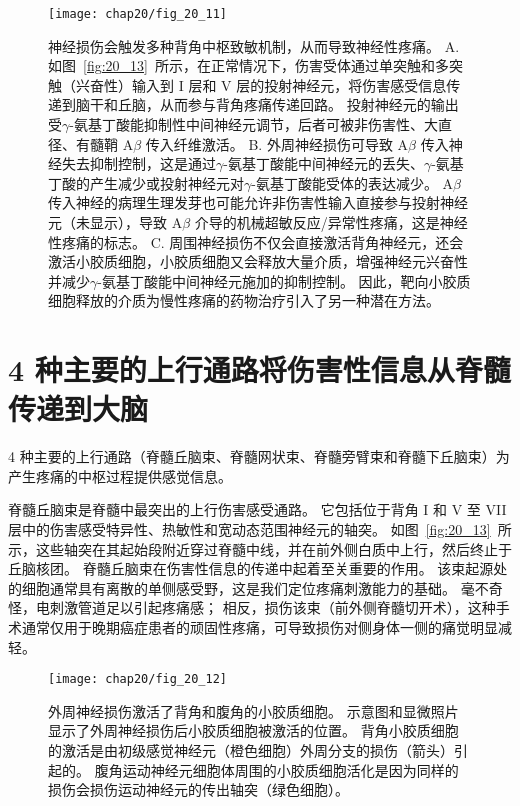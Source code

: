 \begin{figure}[htbp]
	\centering
	\texttt{[image: chap20/fig\_20\_11]}
	\caption{神经损伤会触发多种背角中枢致敏机制，从而导致神经性疼痛。
		A. 如图~\ref{fig:20_13}~所示，在正常情况下，伤害受体通过单突触和多突触（兴奋性）输入到 I 层和 V 层的投射神经元，将伤害感受信息传递到脑干和丘脑，从而参与背角疼痛传递回路。
		投射神经元的输出受$\gamma$-氨基丁酸能抑制性中间神经元调节，后者可被非伤害性、大直径、有髓鞘 A$ \beta $ 传入纤维激活。
		B. 外周神经损伤可导致 A$ \beta $ 传入神经失去抑制控制，这是通过$\gamma$-氨基丁酸能中间神经元的丢失、$\gamma$-氨基丁酸的产生减少或投射神经元对$\gamma$-氨基丁酸能受体的表达减少。
		A$ \beta $ 传入神经的病理生理发芽也可能允许非伤害性输入直接参与投射神经元（未显示），导致 A$ \beta $ 介导的机械超敏反应/异常性疼痛，这是神经性疼痛的标志。
		C. 周围神经损伤不仅会直接激活背角神经元，还会激活小胶质细胞，小胶质细胞又会释放大量介质，增强神经元兴奋性并减少$\gamma$-氨基丁酸能中间神经元施加的抑制控制。
		因此，靶向小胶质细胞释放的介质为慢性疼痛的药物治疗引入了另一种潜在方法。}
	\label{fig:20_11}
\end{figure}



\section{4 种主要的上行通路将伤害性信息从脊髓传递到大脑}

4 种主要的上行通路（脊髓丘脑束、脊髓网状束、脊髓旁臂束和脊髓下丘脑束）为产生疼痛的中枢过程提供感觉信息。


脊髓丘脑束是脊髓中最突出的上行伤害感受通路。
它包括位于背角 I 和 V 至 VII 层中的伤害感受特异性、热敏性和宽动态范围神经元的轴突。
如图~\ref{fig:20_13}~所示，这些轴突在其起始段附近穿过脊髓中线，并在前外侧白质中上行，然后终止于丘脑核团。
脊髓丘脑束在伤害性信息的传递中起着至关重要的作用。 
该束起源处的细胞通常具有离散的单侧感受野，这是我们定位疼痛刺激能力的基础。
毫不奇怪，电刺激管道足以引起疼痛感；
相反，损伤该束（前外侧脊髓切开术），这种手术通常仅用于晚期癌症患者的顽固性疼痛，可导致损伤对侧身体一侧的痛觉明显减轻。


\begin{figure}[htbp]
	\centering
	\texttt{[image: chap20/fig\_20\_12]}
	\caption{外周神经损伤激活了背角和腹角的小胶质细胞。
		示意图和显微照片显示了外周神经损伤后小胶质细胞被激活的位置。
		背角小胶质细胞的激活是由初级感觉神经元（橙色细胞）外周分支的损伤（箭头）引起的。
		腹角运动神经元细胞体周围的小胶质细胞活化是因为同样的损伤会损伤运动神经元的传出轴突（绿色细胞）。}
	\label{fig:20_12}
\end{figure}


